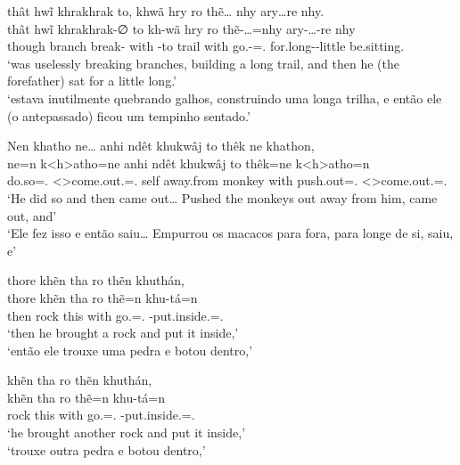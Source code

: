 \documentclass[output=paper,
modfonts,nonflat
]{langsci/langscibook}
\begin{document}
\ea  thât hwĩ khrakhrak to, khwã hry ro thẽ\ldots{} nhy ary\ldots{}re nhy. \\[.3em]
\gll thât   hwĩ    khrakhrak-∅   to   kh-wã     hry   ro   thẽ-\ldots{}=nhy             ary-\ldots{}-re          nhy              \\
     though branch break-\Nmlz{} with \Third-to trail with go.\Sg{}-\Ints{}=\AAnd.\Ds{} for.long-\Ints{}-little be.sitting.\Sg{} \\
\glt `was uselessly breaking branches, building a long trail, and then he (the forefather) sat for a little long.' \\
     `estava inutilmente quebrando galhos, construindo uma longa trilha, e então ele (o antepassado) ficou um tempinho sentado.' \\
\z

\ea  Nen khatho ne\ldots{} anhi ndêt khukwâj to thêk ne khathon, \\[.3em]
\gll ne=n             k<h>atho=ne                       anhi ndêt      khukwâj to   thêk=ne             k<h>atho=n                      \\
     do.so=\AAnd.\Ss{} <\Third>come.out.\Sg{}=\AAnd.\Ss{} self away.from monkey  with push.out=\AAnd.\Ss{} <\Third>come.out.\Sg=\AAnd.\Ss{} \\
\glt `He did so and then came out\ldots{} Pushed the monkeys out away from him, came out, and' \\
     `Ele fez isso e então saiu\ldots{} Empurrou os macacos para fora, para longe de si, saiu, e' \\
\z

\ea  thore khẽn tha ro thẽn khuthán, \\[.3em]
\gll thore khẽn tha  ro   thẽ=n             khu-tá=n                         \\
     then  rock this with go.\Sg=\AAnd.\Ss{} \Third-put.inside.\Sg=\AAnd.\Ss{} \\
\glt `then he brought a rock and put it inside,' \\
     `então ele trouxe uma pedra e botou dentro,' \\
\z

\largerpage[2]
\ea  khẽn tha ro thẽn khuthán, \\[.3em]
\gll khẽn tha  ro   thẽ=n             khu-tá=n                         \\
     rock this with go.\Sg=\AAnd.\Ss{} \Third-put.inside.\Sg=\AAnd.\Ss{} \\
\glt `he brought another rock and put it inside,' \\
     `trouxe outra pedra e botou dentro,' 
\z
\newpage 
\end{document}
